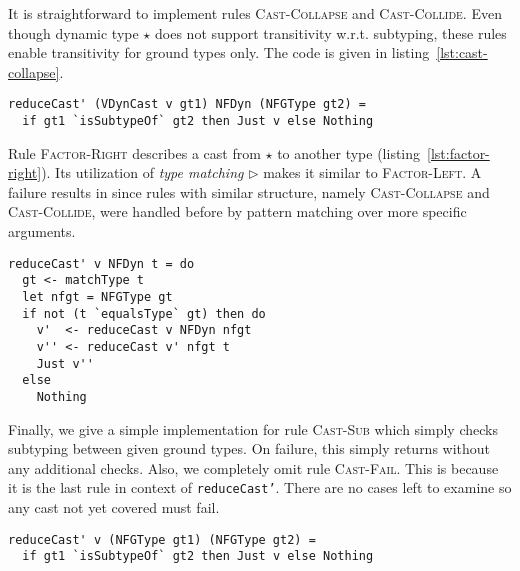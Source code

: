 It is straightforward to implement rules \textsc{Cast-Collapse} and \textsc{Cast-Collide}. Even though dynamic type $\star$ does not support transitivity w.r.t. subtyping, these rules enable transitivity for ground types only. The code is given in listing~\ref{lst:cast-collapse}.

\begin{lstlisting}[float,
  caption=Rules \textsc{Cast-Collapse} and \textsc{Cast-Collide} (\texttt{Interpreter.hs}),
  label=lst:cast-collapse]
reduceCast' (VDynCast v gt1) NFDyn (NFGType gt2) =
  if gt1 `isSubtypeOf` gt2 then Just v else Nothing
\end{lstlisting}

Rule \textsc{Factor-Right} describes a cast from $\star$ to another type (listing~\ref{lst:factor-right}). Its utilization of \emph{type matching} $\rhd$ makes it similar to \textsc{Factor-Left}. A failure results in \blame since rules with similar structure, namely \textsc{Cast-Collapse} and \textsc{Cast-Collide}, were handled before by pattern matching over more specific arguments.

\begin{lstlisting}[float,
  caption=Rule \textsc{Factor-Right} (\texttt{Interpreter.hs}),
  label=lst:factor-right]
reduceCast' v NFDyn t = do
  gt <- matchType t
  let nfgt = NFGType gt
  if not (t `equalsType` gt) then do
    v'  <- reduceCast v NFDyn nfgt
    v'' <- reduceCast v' nfgt t
    Just v''
  else
    Nothing
\end{lstlisting}

Finally, we give a simple implementation for rule \textsc{Cast-Sub} which simply checks subtyping between given ground types. On failure, this simply returns \blame without any additional checks. Also, we completely omit rule \textsc{Cast-Fail}. This is because it is the last rule in context of \texttt{reduceCast'}. There are no cases left to examine so any cast not yet covered must fail.

\begin{lstlisting}[caption=Rule \textsc{Cast-Sub} (\texttt{Interpreter.hs})]
reduceCast' v (NFGType gt1) (NFGType gt2) =
  if gt1 `isSubtypeOf` gt2 then Just v else Nothing
\end{lstlisting}

